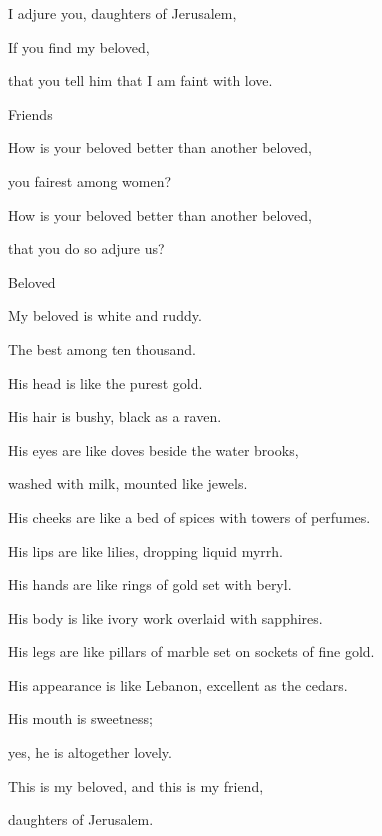 {\par }{\BB \par }{\Q {}I adjure you, daughters of Jerusalem,
\par }{\QB If you find my beloved,
\par }{\QB that you tell him that I am faint with love.
\par }{\SP Friends
\par }{\Q {}How is your beloved better than another beloved,
\par }{\QB you fairest among women?
\par }{\Q How is your beloved better than another beloved,
\par }{\Q that you do so adjure us?
\par }{\SP Beloved
\par }{\Q {}My beloved is white and ruddy.
\par }{\QB The best among ten thousand.
\par }{\Q {}His head is like the purest gold.
\par }{\QB His hair is bushy, black as a raven.
\par }{\Q {}His eyes are like doves beside the water brooks,
\par }{\QB washed with milk, mounted like jewels.
\par }{\Q {}His cheeks are like a bed of spices with towers of perfumes.
\par }{\QB His lips are like lilies, dropping liquid myrrh.
\par }{\Q {}His hands are like rings of gold set with beryl.
\par }{\QB His body is like ivory work overlaid with sapphires.
\par }{\Q {}His legs are like pillars of marble set on sockets of fine gold.
\par }{\QB His appearance is like Lebanon, excellent as the cedars.
\par }{\Q {}His mouth is sweetness;
\par }{\QB yes, he is altogether lovely.
\par }{\Q This is my beloved, and this is my friend,
\par }{\QB daughters of Jerusalem.

}
